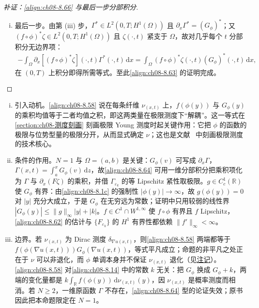 \documentclass[../../main.tex]{subfiles}%
\begin{document}
\begin{proof}[补证：\eqref{align:ch08-8.66} 与最后一步分部积分]
\begin{enumerate}[(i)]
\item 最后一步。由第 (iii) 步，$\Gamma^*\in L^2(0,T;H^1(\Omega))$ 且 $\partial_x\Gamma^*=(G_\phi)^*$；又 $(f\circ\phi)^*\zeta\in L^2(0,T;H^1(\Omega))$ 且 $\zeta(\cdot,t)$ 紧支于 $\Omega$，故对几乎每个 $t$ 分部积分无边界项：
\begin{align*}
-\int_\Omega\partial_x[(f\circ\phi)^*\zeta](\cdot,t)\Gamma^*(\cdot,t)\,\mathrm{d}x
=\int_\Omega(f\circ\phi)^*\zeta(\cdot,t)(G_\phi)^*(\cdot,t)\,\mathrm{d}x,
\end{align*}
在 $(0,T)$ 上积分即得所需等式。至此\eqref{align:ch08-8.63} 的证明完成。
\end{enumerate}
\end{proof}

\begin{remark}\label{remark:ch08-分离等式}
\begin{enumerate}[(i)]
\item 引入动机。\eqref{align:ch08-8.58} 说在每条纤维 $\nu_{(x,t)}$ 上，$f(\phi(y))$ 与 $G_\phi(y)$ 的乘积均值等于二者均值之积，即这两类量在极限测度下“解耦”。这一等式在\cref{section:ch08-测度刻画} 刻画极限 Young 测度时起关键作用：它把 $\phi$ 的函数的极限与位势型量的极限分开，从而显式确定 $\nu$；这也是文献~\cite{ref100} 中刻画极限测度的技术核心。
\item 条件的作用。$N=1$ 与 $\Omega=(a,b)$ 是关键：$G_\phi(v)$ 可写成 $\partial_x\Gamma$，$\Gamma(x,t)=\int_a^xG_\phi(v)\,\mathrm{d}z$，故\eqref{align:ch08-8.64} 可用一维分部积分把乘积项化为 $\Gamma$ 与 $\partial_x(F\zeta)$ 的乘积，并借 $\Gamma_{\varepsilon_k}$ 的等 Lipschitz 紧性取极限。$g\in C^1_c(\mathbb{R})$ 使 $G_\phi$ 有界：由\eqref{align:ch08-8.1c} 的强制性 $|\phi(y)|\to\infty$，故 $g(\phi(y))=0$ 对 $|y|$ 充分大成立，于是 $G_\phi$ 在无穷远为常数；证明中只用较弱的线性界 $|G_\phi(y)|\leqslant\|g\|_\infty|y|+|k|$。$f\in C^1\cap W^{1,\infty}$ 使 $f\circ\phi$ 有界且 $f$ Lipschitz，\eqref{align:ch08-8.62} 的估计与 $\{F_{\varepsilon_k}\}$ 的 $H^1$ 有界性都依赖 $\|f'\|_\infty<\infty$。
\item 边界。若 $\nu_{(x,t)}$ 为 Dirac 测度 $\delta_{\nabla u(x,t)}$，则\eqref{align:ch08-8.58} 两端都等于 $f(\phi(\nabla u(x,t)))G_\phi(\nabla u(x,t))$，等式平凡成立；命题的非平凡之处正在于 $\nu$ 可以非退化，而 $\phi$ 单调本身并不保证 $\nu_{(x,t)}$ 退化（见\hyperref[remark:ch08-Young平衡解]{注记}）。\eqref{align:ch08-8.58} 对\eqref{align:ch08-8.14} 中的常数 $k$ 无关：把 $G_\phi$ 换成 $G_\phi+k$，两端的变化量都是 $k\int_{\mathbb{R}}f(\phi(y))\,\mathrm{d}\nu_{(x,t)}(y)$，因 $\nu_{(x,t)}$ 是概率测度而相消。若 $N\geqslant2$，一维原函数 $\Gamma$ 不存在，\eqref{align:ch08-8.64} 型的论证失效；原书因此把本命题限定在 $N=1$。
\end{enumerate}
\end{remark}
\end{document}
